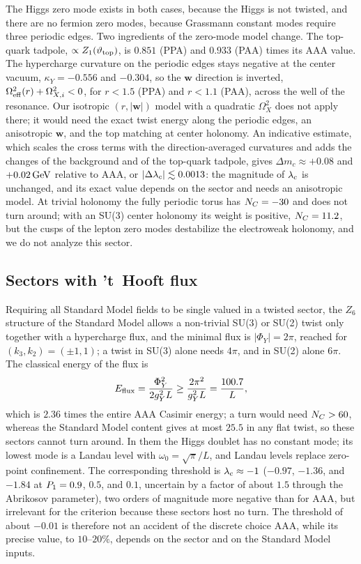 The Higgs zero mode exists in both cases, because the Higgs is not twisted, and there are no fermion zero modes, because Grassmann constant modes require three periodic edges.
Two ingredients of the zero-mode model change.
The top-quark tadpole, $\propto Z_1(\vartheta_{\rm top})$, is $0.851$ (PPA) and $0.933$ (PAA) times its AAA value. %
The hypercharge curvature on the periodic edges stays negative at the center vacuum, $\kappa_Y=-0.556$ and $-0.304$, so the $\bm w$ direction is inverted, $\Omega_{\rm eff}^2(r)+\Omega_{X,i}^2<0$, for $r<1.5$ (PPA) and $r<1.1$ (PAA), across the well of the resonance. %
Our isotropic $(r,|\bm w|)$ model with a quadratic $\Omega_X^2$ does not apply there; it would need the exact twist energy along the periodic edges, an anisotropic $\bm w$, and the top matching at center holonomy.
An indicative estimate, which scales the cross terms with the direction-averaged curvatures and adds the changes of the background and of the top-quark tadpole, gives $\Delta m_c\approx+0.08$ and $+0.02\,\mathrm{GeV}$ relative to AAA, or $|\Delta\lambda_c|\lesssim0.0013$: the magnitude of $\lambda_c$ is unchanged, and its exact value depends on the sector and needs an anisotropic model. %
At trivial holonomy the fully periodic torus has $N_C=-30$ and does not turn around; with an SU(3) center holonomy its weight is positive, $N_C=11.2$, but the cusps of the lepton zero modes destabilize the electroweak holonomy, and we do not analyze this sector. %

\subsection{Sectors with 't~Hooft flux}
\label{sec:rb-flux}

Requiring all Standard Model fields to be single valued in a twisted sector, the $Z_6$ structure of the Standard Model allows a non-trivial SU(3) or SU(2) twist only together with a hypercharge flux, and the minimal flux is $|\Phi_Y|=2\pi$, reached for $(k_3,k_2)=(\pm1,1)$; a twist in SU(3) alone needs $4\pi$, and in SU(2) alone $6\pi$. %
The classical energy of the flux is
\begin{equation}
E_{\rm flux}=\frac{\Phi_Y^2}{2g_Y^2L}\ge\frac{2\pi^2}{g_Y^2L}=\frac{100.7}{L}, %
\label{eq:rb-flux}
\end{equation}
which is $2.36$ times the entire AAA Casimir energy; a turn would need $N_C>60$, whereas the Standard Model content gives at most $25.5$ in any flat twist, so these sectors cannot turn around. %
In them the Higgs doublet has no constant mode; its lowest mode is a Landau level with $\omega_0=\sqrt\pi/L$, and Landau levels replace zero-point confinement.
The corresponding threshold is $\lambda_c\approx-1$ ($-0.97$, $-1.36$, and $-1.84$ at $P_1=0.9$, $0.5$, and $0.1$, uncertain by a factor of about $1.5$ through the Abrikosov parameter), two orders of magnitude more negative than for AAA, but irrelevant for the criterion because these sectors host no turn. %
The threshold of about $-0.01$ is therefore not an accident of the discrete choice AAA, while its precise value, to $10$--$20\%$, depends on the sector and on the Standard Model inputs. %

